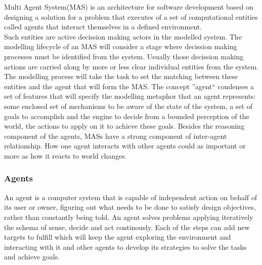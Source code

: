 \documentclass[11pt,oneside,a4paper,openright]{report}
\begin{document}
Multi Agent System(MAS) is an architecture for software development based on designing a solution for a problem that 
executes of a set of computational entities called agents that interact themselves in a defined environment.\\
Such entities are active decission making actors in the modelled system. The modelling lifecycle of an MAS will consider a stage where decission making processes must be identified from the system. Usually those decission making actions are carried along by more or less clear individual entities from the system. The modelling process will take the task to set the matching between these entities and the agent that will form the MAS. The concept ''agent`` condenses a set of features that will specify the modelling metaphor that an agent represents:
some enclosed set of mechanisms to be aware of the state of the system, a set of goals to accomplish and the engine to decide from a bounded perception of the world, the actions to apply on it to achieve these goals. Besides the reasoning component of the agents, MASs have a strong component of inter-agent relationship. How one agent interacts with other agents could as important or more as how it reacts to world changes.


\subsubsection{Agents}




An agent is a computer system that is capable of independent action on behalf of its user or owner,
figuring out what needs to be done to satisfy design objectives, rather than constantly being told.\cite{Wooldridge2002} An agent solves problems applying iteratively the schema of sense, decide and 
act continously. Each of the steps can add new targets to fulfill which will keep the agent exploring 
the environment and interacting with it and other agents to develop its strategies to solve the tasks 
and achieve goals.\\
\end{document}
